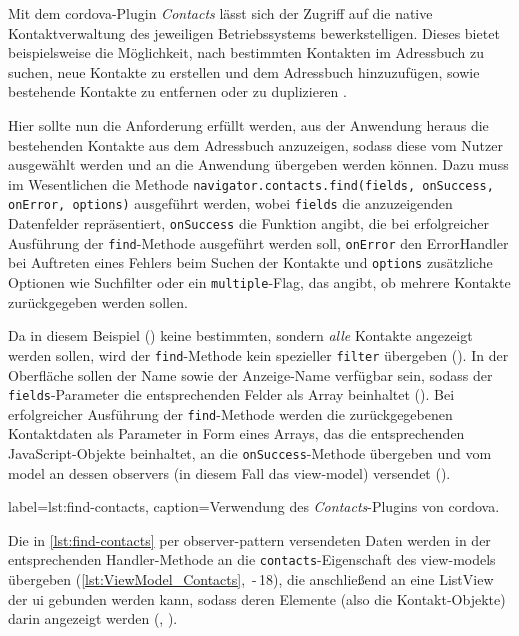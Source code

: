 Mit dem \gls{cordova}-Plugin \emph{Contacts} lässt sich der Zugriff auf die native Kontaktverwaltung des jeweiligen Betriebssystems bewerkstelligen.
Dieses bietet beispielsweise die Möglichkeit, nach bestimmten Kontakten im Adressbuch zu suchen, neue Kontakte zu erstellen und dem Adressbuch hinzuzufügen, sowie bestehende Kontakte zu entfernen oder zu duplizieren \cite{Cordova_Plugin_Registry_Contacts}.

Hier sollte nun die Anforderung erfüllt werden, aus der Anwendung heraus die bestehenden Kontakte aus dem Adressbuch anzuzeigen, sodass diese vom Nutzer ausgewählt werden und an die Anwendung übergeben werden können.
Dazu muss im Wesentlichen die Methode \lstinline|navigator.contacts.find(fields, onSuccess, onError, options)| ausgeführt werden, wobei \lstinline|fields| die anzuzeigenden Datenfelder repräsentiert, \lstinline|onSuccess| die Funktion angibt, die bei erfolgreicher Ausführung der \lstinline|find|-Methode ausgeführt werden soll, \lstinline|onError| den ErrorHandler bei Auftreten eines Fehlers beim Suchen der Kontakte und \lstinline|options| zusätzliche Optionen wie Suchfilter oder ein \lstinline|multiple|-Flag, das angibt, ob mehrere Kontakte zurückgegeben werden sollen.

Da in diesem Beispiel () keine bestimmten, sondern \emph{alle} Kontakte angezeigt werden sollen, wird der \lstinline|find|-Methode kein spezieller \lstinline|filter| übergeben (). In der Oberfläche sollen der Name sowie der Anzeige-Name verfügbar sein, sodass der \lstinline|fields|-Parameter die entsprechenden Felder als Array beinhaltet (). Bei erfolgreicher Ausführung der \lstinline|find|-Methode werden die zurückgegebenen Kontaktdaten als Parameter in Form eines Arrays, das die entsprechenden JavaScript-Objekte beinhaltet, an die \lstinline|onSuccess|-Methode übergeben und vom \gls{model} an dessen \glspl{observer} (in diesem Fall das \gls{view-model}) versendet ().

	 { label=lst:find-contacts, caption={Verwendung des \emph{Contacts}-Plugins von \gls{cordova}.}}

Die in \autoref{lst:find-contacts} per \gls{observer-pattern} versendeten Daten werden in der entsprechenden Handler-Methode an die \lstinline|contacts|-Eigenschaft des \glspl{view-model} übergeben (\autoref{lst:ViewModel_Contacts}, \,-\,18), die anschließend an eine ListView der \gls{ui} gebunden werden kann, sodass deren Elemente (also die Kontakt-Objekte) darin angezeigt werden (, ). %

